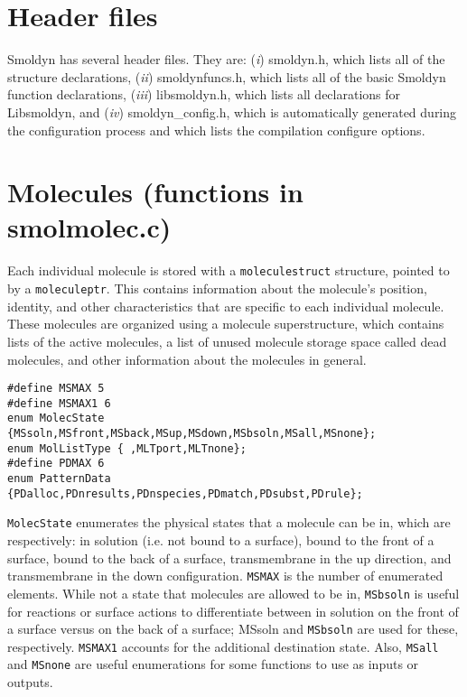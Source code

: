 \documentclass {book}
\begin{document}
\section{Header files}

Smoldyn has several header files.  They are: (\emph{i}) smoldyn.h, which lists all of the structure declarations, (\emph{ii}) smoldynfuncs.h, which lists all of the basic Smoldyn function declarations, (\emph{iii}) libsmoldyn.h, which lists all declarations for Libsmoldyn, and (\emph{iv}) smoldyn\_config.h, which is automatically generated during the configuration process and which lists the compilation configure options.

\section{Molecules (functions in smolmolec.c)}

Each individual molecule is stored with a \texttt{moleculestruct} structure, pointed to by a \texttt{moleculeptr}.  This contains information about the molecule's position, identity, and other characteristics that are specific to each individual molecule.  These molecules are organized using a molecule superstructure, which contains lists of the active molecules, a list of unused molecule storage space called dead molecules, and other information about the molecules in general.

\begin{lstlisting}
#define MSMAX 5
#define MSMAX1 6
enum MolecState {MSsoln,MSfront,MSback,MSup,MSdown,MSbsoln,MSall,MSnone};
enum MolListType { ,MLTport,MLTnone};
#define PDMAX 6
enum PatternData {PDalloc,PDnresults,PDnspecies,PDmatch,PDsubst,PDrule};
\end{lstlisting}

\texttt{MolecState} enumerates the physical states that a molecule can be in, which are respectively: in solution (i.e. not bound to a surface), bound to the front of a surface, bound to the back of a surface, transmembrane in the up direction, and transmembrane in the down configuration.  \texttt{MSMAX} is the number of enumerated elements.  While not a state that molecules are allowed to be in, \texttt{MSbsoln} is useful for reactions or surface actions to differentiate between in solution on the front of a surface versus on the back of a surface; MSsoln and \texttt{MSbsoln} are used for these, respectively.  \texttt{MSMAX1} accounts for the additional destination state.  Also, \texttt{MSall} and \texttt{MSnone} are useful enumerations for some functions to use as inputs or outputs.
\end{document}
